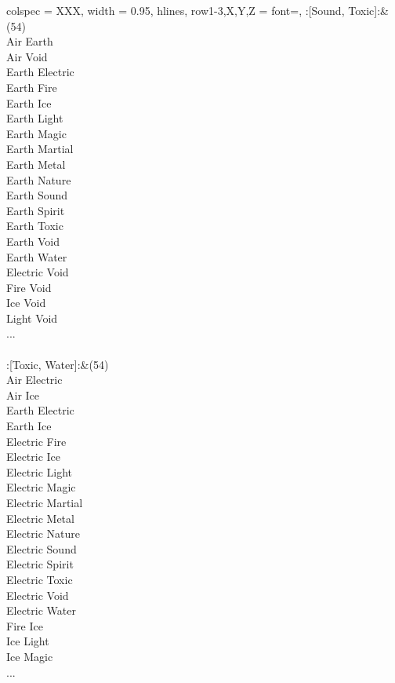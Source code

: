 \begin{longtblr}[
	caption = {2v2 Defending Weak},
	label = {2v2-Defending-Weak},
]{
	colspec = {XXX}, width = 0.95\linewidth,
	hlines,
	row{1-3,X,Y,Z} = {font=\bfseries},
}
	:[Sound, Toxic]:&{(54)\\
	Air Earth \\
	Air Void \\
	Earth Electric \\
	Earth Fire \\
	Earth Ice \\
	Earth Light \\
	Earth Magic \\
	Earth Martial \\
	Earth Metal \\
	Earth Nature \\
	Earth Sound \\
	Earth Spirit \\
	Earth Toxic \\
	Earth Void \\
	Earth Water \\
	Electric Void \\
	Fire Void \\
	Ice Void \\
	Light Void \\
	...\\
	}\\

	:[Toxic, Water]:&{(54)\\
	Air Electric \\
	Air Ice \\
	Earth Electric \\
	Earth Ice \\
	Electric Fire \\
	Electric Ice \\
	Electric Light \\
	Electric Magic \\
	Electric Martial \\
	Electric Metal \\
	Electric Nature \\
	Electric Sound \\
	Electric Spirit \\
	Electric Toxic \\
	Electric Void \\
	Electric Water \\
	Fire Ice \\
	Ice Light \\
	Ice Magic \\
	...\\
	}\\


\end{longtblr}
